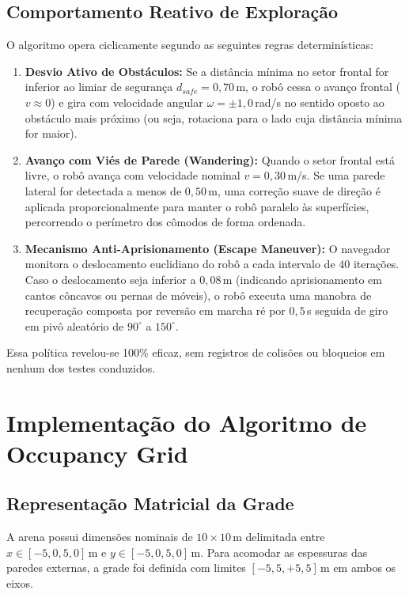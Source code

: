 \documentclass[11pt,a4paper]{article}
\begin{document}
\subsection{Comportamento Reativo de Exploração}
O algoritmo opera ciclicamente segundo as seguintes regras determinísticas:
\begin{enumerate}
    \item \textbf{Desvio Ativo de Obstáculos:} Se a distância mínima no setor frontal for inferior ao limiar de segurança $d_{safe} = 0{,}70$\,m, o robô cessa o avanço frontal ($v \approx 0$) e gira com velocidade angular $\omega = \pm 1{,}0$\,rad/s no sentido oposto ao obstáculo mais próximo (ou seja, rotaciona para o lado cuja distância mínima for maior).
    \item \textbf{Avanço com Viés de Parede (Wandering):} Quando o setor frontal está livre, o robô avança com velocidade nominal $v = 0{,}30$\,m/s. Se uma parede lateral for detectada a menos de $0{,}50$\,m, uma correção suave de direção é aplicada proporcionalmente para manter o robô paralelo às superfícies, percorrendo o perímetro dos cômodos de forma ordenada.
    \item \textbf{Mecanismo Anti-Aprisionamento (Escape Maneuver):} O navegador monitora o deslocamento euclidiano do robô a cada intervalo de $40$ iterações. Caso o deslocamento seja inferior a $0{,}08$\,m (indicando aprisionamento em cantos côncavos ou pernas de móveis), o robô executa uma manobra de recuperação composta por reversão em marcha ré por $0{,}5$\,s seguida de giro em pivô aleatório de $90^\circ$ a $150^\circ$.
\end{enumerate}

Essa política revelou-se 100\% eficaz, sem registros de colisões ou bloqueios em nenhum dos testes conduzidos.

\section{Implementação do Algoritmo de Occupancy Grid}

\subsection{Representação Matricial da Grade}
A arena possui dimensões nominais de $10 \times 10$\,m delimitada entre $x \in [-5{,}0, 5{,}0]$\,m e $y \in [-5{,}0, 5{,}0]$\,m. Para acomodar as espessuras das paredes externas, a grade foi definida com limites $[-5{,}5, +5{,}5]$\,m em ambos os eixos.
\end{document}
